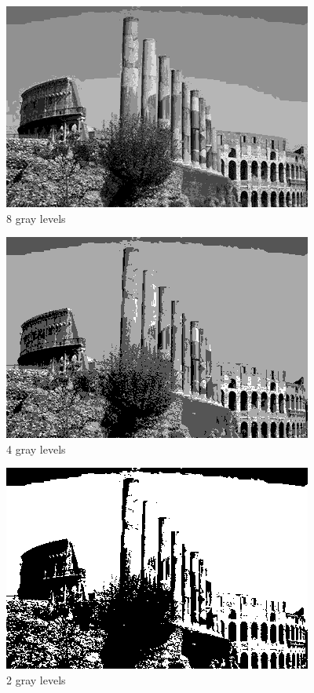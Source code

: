 \documentclass{article}
\begin{document}
\begin{figure}[H]
\centering
\includegraphics[width=288pt]{../result/quantize-8.png}
\caption{8 gray levels}
\label{quan8}
\end{figure}

\begin{figure}[H]
\centering
\includegraphics[width=288pt]{../result/quantize-4.png}
\caption{4 gray levels}
\label{quan4}
\end{figure}

\begin{figure}[H]
\centering
\includegraphics[width=288pt]{../result/quantize-2.png}
\caption{2 gray levels}
\label{quan2}
\end{figure}
\end{document}
